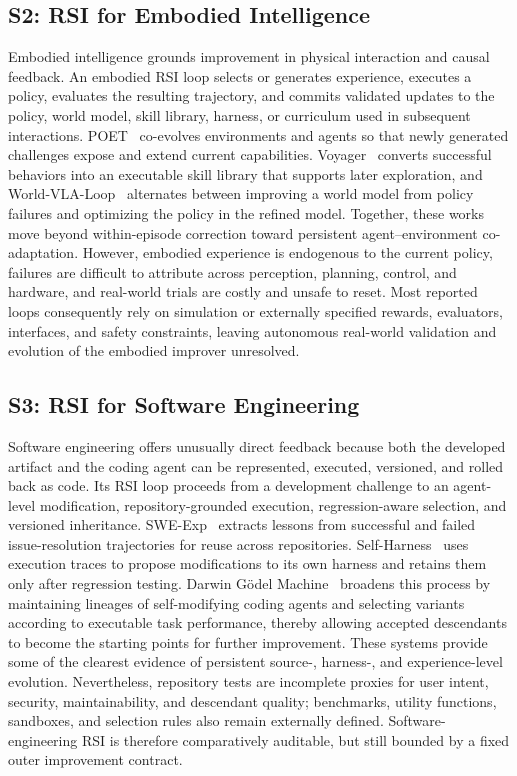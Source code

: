 \subsection{S2: RSI for Embodied Intelligence}
\label{subsec:embodied-main}

Embodied intelligence grounds improvement in physical interaction and causal feedback. An embodied RSI loop selects or generates experience, executes a policy, evaluates the resulting trajectory, and commits validated updates to the policy, world model, skill library, harness, or curriculum used in subsequent interactions. POET~\cite{wang2019poet} co-evolves environments and agents so that newly generated challenges expose and extend current capabilities. Voyager~\cite{wang2023voyager} converts successful behaviors into an executable skill library that supports later exploration, and World-VLA-Loop~\cite{liu2026worldvlaloop} alternates between improving a world model from policy failures and optimizing the policy in the refined model. Together, these works move beyond within-episode correction toward persistent agent--environment co-adaptation. However, embodied experience is endogenous to the current policy, failures are difficult to attribute across perception, planning, control, and hardware, and real-world trials are costly and unsafe to reset. Most reported loops consequently rely on simulation or externally specified rewards, evaluators, interfaces, and safety constraints, leaving autonomous real-world validation and evolution of the embodied improver unresolved.

\subsection{S3: RSI for Software Engineering}
\label{subsec:software-main}

Software engineering offers unusually direct feedback because both the developed artifact and the coding agent can be represented, executed, versioned, and rolled back as code. Its RSI loop proceeds from a development challenge to an agent-level modification, repository-grounded execution, regression-aware selection, and versioned inheritance. SWE-Exp~\cite{chen2026sweexp} extracts lessons from successful and failed issue-resolution trajectories for reuse across repositories. Self-Harness~\cite{zhang2026selfharness} uses execution traces to propose modifications to its own harness and retains them only after regression testing. Darwin G\"odel Machine~\cite{zhang2026dgm} broadens this process by maintaining lineages of self-modifying coding agents and selecting variants according to executable task performance, thereby allowing accepted descendants to become the starting points for further improvement. These systems provide some of the clearest evidence of persistent source-, harness-, and experience-level evolution. Nevertheless, repository tests are incomplete proxies for user intent, security, maintainability, and descendant quality; benchmarks, utility functions, sandboxes, and selection rules also remain externally defined. Software-engineering RSI is therefore comparatively auditable, but still bounded by a fixed outer improvement contract.


